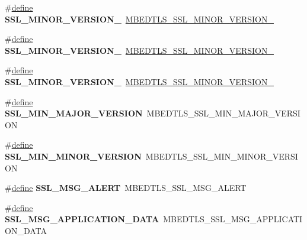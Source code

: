 \begin{DoxyCompactItemize}
\#\hyperlink{structdefine}{define} {\bfseries S\+S\+L\+\_\+\+M\+I\+N\+O\+R\+\_\+\+V\+E\+R\+S\+I\+O\+N\+\_}~\hyperlink{ssl_8h_a364e4bfbd4f909a2aa7ac5eb31c6b1b2}{M\+B\+E\+D\+T\+L\+S\+\_\+\+S\+S\+L\+\_\+\+M\+I\+N\+O\+R\+\_\+\+V\+E\+R\+S\+I\+O\+N\+\_}
\item 
\mbox{\label{compat-1_83_8h_aab565447d7abe2dcb01544e7dbfcd4c9}} 
\#\hyperlink{structdefine}{define} {\bfseries S\+S\+L\+\_\+\+M\+I\+N\+O\+R\+\_\+\+V\+E\+R\+S\+I\+O\+N\+\_}~\hyperlink{ssl_8h_a9fe59361b834e334b80efacb10f8e33a}{M\+B\+E\+D\+T\+L\+S\+\_\+\+S\+S\+L\+\_\+\+M\+I\+N\+O\+R\+\_\+\+V\+E\+R\+S\+I\+O\+N\+\_}
\item 
\mbox{\label{compat-1_83_8h_a6d963f23682491708743fd3de381cc1d}} 
\#\hyperlink{structdefine}{define} {\bfseries S\+S\+L\+\_\+\+M\+I\+N\+O\+R\+\_\+\+V\+E\+R\+S\+I\+O\+N\+\_}~\hyperlink{ssl_8h_a3c5a90b4b4aded2190f31f7d4c670cb4}{M\+B\+E\+D\+T\+L\+S\+\_\+\+S\+S\+L\+\_\+\+M\+I\+N\+O\+R\+\_\+\+V\+E\+R\+S\+I\+O\+N\+\_}
\item 
\mbox{\label{compat-1_83_8h_a8480d96b4e54df5a6a7a31e38edc35c2}} 
\#\hyperlink{structdefine}{define} {\bfseries S\+S\+L\+\_\+\+M\+I\+N\+\_\+\+M\+A\+J\+O\+R\+\_\+\+V\+E\+R\+S\+I\+ON}~M\+B\+E\+D\+T\+L\+S\+\_\+\+S\+S\+L\+\_\+\+M\+I\+N\+\_\+\+M\+A\+J\+O\+R\+\_\+\+V\+E\+R\+S\+I\+ON
\item 
\mbox{\label{compat-1_83_8h_a9505bd0c270200150a26b6d85afc0934}} 
\#\hyperlink{structdefine}{define} {\bfseries S\+S\+L\+\_\+\+M\+I\+N\+\_\+\+M\+I\+N\+O\+R\+\_\+\+V\+E\+R\+S\+I\+ON}~M\+B\+E\+D\+T\+L\+S\+\_\+\+S\+S\+L\+\_\+\+M\+I\+N\+\_\+\+M\+I\+N\+O\+R\+\_\+\+V\+E\+R\+S\+I\+ON
\item 
\mbox{\label{compat-1_83_8h_a3d6dc94916f324f0a42881bd6e6f7db6}} 
\#\hyperlink{structdefine}{define} {\bfseries S\+S\+L\+\_\+\+M\+S\+G\+\_\+\+A\+L\+E\+RT}~M\+B\+E\+D\+T\+L\+S\+\_\+\+S\+S\+L\+\_\+\+M\+S\+G\+\_\+\+A\+L\+E\+RT
\item 
\mbox{\label{compat-1_83_8h_a6ea7789fe625447a1bf69d9a2382c861}} 
\#\hyperlink{structdefine}{define} {\bfseries S\+S\+L\+\_\+\+M\+S\+G\+\_\+\+A\+P\+P\+L\+I\+C\+A\+T\+I\+O\+N\+\_\+\+D\+A\+TA}~M\+B\+E\+D\+T\+L\+S\+\_\+\+S\+S\+L\+\_\+\+M\+S\+G\+\_\+\+A\+P\+P\+L\+I\+C\+A\+T\+I\+O\+N\+\_\+\+D\+A\+TA

\end{DoxyCompactItemize}
